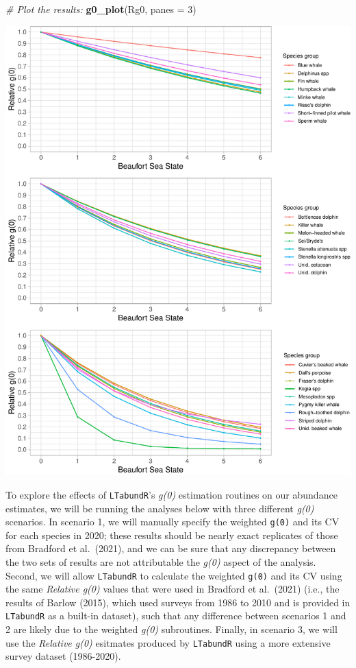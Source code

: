 \documentclass[
]{book}
\newenvironment{Shaded}{\begin{snugshade}}{\end{snugshade}}
\newcommand{\CommentTok}[1]{\textcolor[rgb]{0.56,0.35,0.01}{\textit{#1}}}
\newcommand{\DataTypeTok}[1]{\textcolor[rgb]{0.13,0.29,0.53}{#1}}
\newcommand{\DecValTok}[1]{\textcolor[rgb]{0.00,0.00,0.81}{#1}}
\newcommand{\KeywordTok}[1]{\textcolor[rgb]{0.13,0.29,0.53}{\textbf{#1}}}
\newcommand{\NormalTok}[1]{#1}
\begin{document}
\begin{Shaded}
\begin{Highlighting}[]
\CommentTok{# Plot the results: }
\KeywordTok{g0_plot}\NormalTok{(Rg0, }\DataTypeTok{panes =} \DecValTok{3}\NormalTok{)}
\end{Highlighting}
\end{Shaded}

\includegraphics{figures/unnamed-chunk-339-1.pdf}

To explore the effects of \texttt{LTabundR}'s \emph{g(0)} estimation routines on our abundance estimates, we will be running the analyses below with three different \emph{g(0)} scenarios. In scenario 1, we will manually specify the weighted \texttt{g(0)} and its CV for each species in 2020; these results should be nearly exact replicates of those from Bradford et al.~(2021), and we can be sure that any discrepancy between the two sets of results are not attributable the \emph{g(0)} aspect of the analysis. Second, we will allow \texttt{LTabundR} to calculate the weighted \texttt{g(0)} and its CV using the same \emph{Relative g(0)} values that were used in Bradford et al.~(2021) (i.e., the results of Barlow (2015), which used surveys from 1986 to 2010 and is provided in \texttt{LTabundR} as a built-in dataset), such that any difference between scenarios 1 and 2 are likely due to the weighted \emph{g(0)} subroutines. Finally, in scenario 3, we will use the \emph{Relative g(0)} esitmates produced by \texttt{LTabundR} using a more extensive survey dataset (1986-2020).
\end{document}

